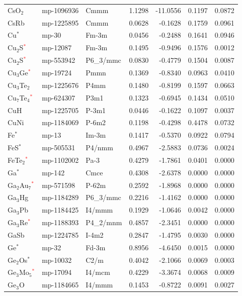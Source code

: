 \begin{longtable}{@{}lllrrrr@{}}
CsO$_{2}$ & mp-1096936 & Cmmm & 1.1298 & -11.0556 & 0.1197 & 0.0872 \\
CsRb & mp-1225895 & Cmmm & 0.0628 & -0.1628 & 0.1759 & 0.0961 \\
Cu$^*$ & mp-30 & Fm-3m & 0.0456 & -0.2488 & 0.1641 & 0.0946 \\
Cu$_{2}$S\textcolor{red}{$^*$} & mp-12087 & Fm-3m & 0.1495 & -0.9496 & 0.1576 & 0.0012 \\
Cu$_{2}$S\textcolor{red}{$^*$} & mp-553942 & P6\_3/mmc & 0.0830 & -0.4779 & 0.1504 & 0.0087 \\
Cu$_{3}$Ge\textcolor{red}{$^*$} & mp-19724 & Pmmn & 0.1369 & -0.8340 & 0.0963 & 0.0410 \\
Cu$_{3}$Te$_{2}$ & mp-1225676 & P4mm & 0.1480 & -0.8199 & 0.1597 & 0.0663 \\
Cu$_{7}$Te$_{4}$\textcolor{red}{$^*$} & mp-624307 & P3m1 & 0.1323 & -0.6945 & 0.1434 & 0.0510 \\
CuH & mp-1225705 & P-3m1 & 0.0446 & -0.1622 & 0.1097 & 0.0037 \\
CuNi & mp-1184069 & P-6m2 & 0.1198 & -0.4298 & 0.4478 & 0.0732 \\
Fe$^*$ & mp-13 & Im-3m & 0.1417 & -0.5370 & 0.0922 & 0.0794 \\
FeS$^*$ & mp-505531 & P4/nmm & 0.4967 & -2.5883 & 0.0736 & 0.0024 \\
FeTe$_{2}$\textcolor{red}{$^*$} & mp-1102002 & Pa-3 & 0.4279 & -1.7861 & 0.0401 & 0.0000 \\
Ga$^*$ & mp-142 & Cmce & 0.4308 & -2.6378 & 0.0000 & 0.0000 \\
Ga$_{2}$Au$_{7}$\textcolor{red}{$^*$} & mp-571598 & P-62m & 0.2592 & -1.8968 & 0.0000 & 0.0000 \\
Ga$_{3}$Hg & mp-1184289 & P6\_3/mmc & 0.2216 & -1.4162 & 0.0000 & 0.0000 \\
Ga$_{3}$Pb & mp-1184425 & I4/mmm & 0.1929 & -1.0646 & 0.0042 & 0.0000 \\
Ga$_{3}$Re\textcolor{red}{$^*$} & mp-1188393 & P4\_2/mnm & 0.4857 & -2.3451 & 0.0000 & 0.0000 \\
GaSb & mp-1224785 & I-4m2 & 0.2847 & -1.4795 & 0.0030 & 0.0000 \\
Ge$^*$ & mp-32 & Fd-3m & 0.8956 & -4.6450 & 0.0015 & 0.0000 \\
Ge$_{2}$Os$^*$ & mp-10032 & C2/m & 0.4042 & -2.1066 & 0.0069 & 0.0003 \\
Ge$_{3}$Mo$_{5}$\textcolor{red}{$^*$} & mp-17094 & I4/mcm & 0.4229 & -3.3674 & 0.0068 & 0.0009 \\
Ge$_{3}$O & mp-1184665 & I4/mmm & 0.1453 & -0.8722 & 0.0091 & 0.0027 \\

\end{longtable}
